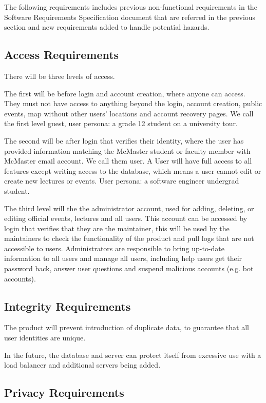 \documentclass{article}
\begin{document}
The following requirements includes previous non-functional requirements in the Software Requirements Specification document that are referred in the previous section and new requirements added to handle potential hazards.

\subsection{Access Requirements}

There will be three levels of access. 

The first will be before login and account creation, where anyone can access. They must not have access to anything beyond the login, account creation, public events, map without other users' locations and account recovery pages. We call the first level guest, user persona: a grade 12 student on a university tour.

The second will be after login that verifies their identity, where the user has provided information matching the McMaster student or faculty member with McMaster email account. We call them user. A User will have full access to all features except writing access to the database, which means a user cannot edit or create new lectures or events. User persona: a software engineer undergrad student.

The third level will the the administrator account, used for adding, deleting, or editing official events, lectures and all users. This account can be accessed by login that verifies that they are the maintainer, this will be used by the maintainers to check the functionality of the product and pull logs that are not accessible to users.  Administrators are responsible to bring up-to-date information to all users and manage all users, including help users get their password back, answer user questions and suspend malicious accounts (e.g. bot accounts).

\subsection{Integrity Requirements}

The product will prevent introduction of duplicate data, to guarantee that all user identities are unique.

In the future, the database and server can protect itself from excessive use with a load balancer and additional servers being added.

\subsection{Privacy Requirements}
\end{document}
